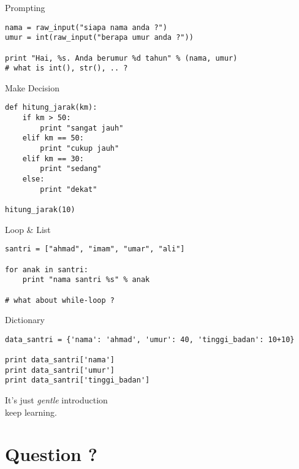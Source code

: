 \begin{xframe}{Prompting}
\begin{verbatim}
nama = raw_input("siapa nama anda ?")
umur = int(raw_input("berapa umur anda ?"))

print "Hai, %s. Anda berumur %d tahun" % (nama, umur)
# what is int(), str(), .. ?
\end{verbatim}
\end{xframe}

\begin{xframe}{Make Decision}
\begin{verbatim}
def hitung_jarak(km):
    if km > 50:
        print "sangat jauh"
    elif km == 50:
        print "cukup jauh"
    elif km == 30:
        print "sedang"
    else:
        print "dekat"

hitung_jarak(10)
\end{verbatim}
\end{xframe}

\begin{xframe}{Loop \& List}
\begin{verbatim}
santri = ["ahmad", "imam", "umar", "ali"]

for anak in santri:
    print "nama santri %s" % anak

# what about while-loop ?
\end{verbatim}
\end{xframe}

\begin{xframe}{Dictionary}
\begin{verbatim}
data_santri = {'nama': 'ahmad', 'umur': 40, 'tinggi_badan': 10+10}

print data_santri['nama']
print data_santri['umur']
print data_santri['tinggi_badan']
\end{verbatim}
\end{xframe}

\begin{xframe}
\begin{center}
  {\huge It's just \emph{gentle} introduction} \\
  keep learning.
  \end{center}
\end{xframe}

\section{Question ?}


